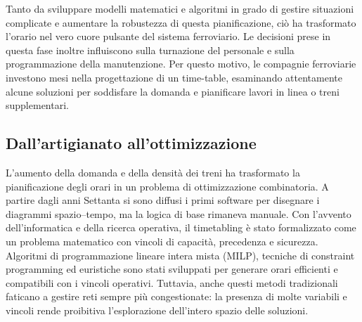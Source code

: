\documentclass[a4paper,12pt]{report}
\begin{document}
Tanto da sviluppare modelli matematici e algoritmi in grado di gestire situazioni complicate e aumentare la robustezza di questa pianificazione, ciò ha trasformato l'orario nel vero cuore pulsante del sistema ferroviario.
Le decisioni prese in questa fase inoltre influiscono sulla turnazione del personale e sulla programmazione della manutenzione.
Per questo motivo, le compagnie ferroviarie investono mesi nella progettazione di un time-table, esaminando attentamente alcune soluzioni per soddisfare la domanda e pianificare lavori in linea o treni supplementari.
\subsection{Dall’artigianato all’ottimizzazione}
L’aumento della domanda e della densità dei treni ha trasformato la pianificazione degli orari in un problema di ottimizzazione combinatoria. A partire dagli anni Settanta si sono diffusi i primi software per disegnare i diagrammi spazio–tempo, ma la logica di base rimaneva manuale. Con l’avvento dell’informatica e della ricerca operativa, il timetabling è stato formalizzato come un problema matematico con vincoli di capacità, precedenza e sicurezza. Algoritmi di programmazione lineare intera mista (MILP), tecniche di constraint programming ed euristiche sono stati sviluppati per generare orari efficienti e compatibili con i vincoli operativi.
Tuttavia, anche questi metodi tradizionali faticano a gestire reti sempre più congestionate: la presenza di molte variabili e vincoli rende proibitiva l’esplorazione dell’intero spazio delle soluzioni.
\end{document}
